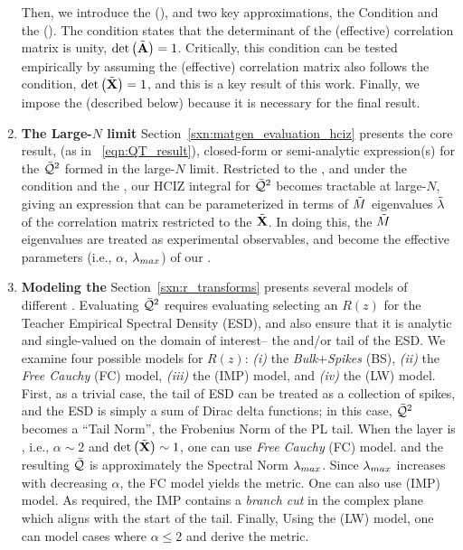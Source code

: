 \begin{enumerate}[label=5.\arabic*]
Then, we introduce the \EffectiveCorrelationSpace (\ECS), and two key approximations,
the \TRACELOG Condition and the \IndependentFluctuationApproximation (\IFA).
The \TRACELOG condition states that the determinant of the (effective) \Student correlation matrix is unity, $\mbox{}{\text{det}}\left(\tilde{\mathbf{A}}\right)=1$.
Critically, this condition can be tested empirically by assuming the (effective) \Teacher correlation matrix
also follows the \TRACELOG condition, $\mbox{}{\text{det}}\left(\tilde{\mathbf{X}}\right)=1$, and this is a key result of this work.
Finally, we impose the \IFA (described below) because it is necessary for the final result.

\item
\textbf{The Large-$N$ limit}
Section~\ref{sxn:matgen_evaluation_hciz} presents the core result,
(as in \EQN~\ref{eqn:QT_result}),
closed-form or semi-analytic expression(s) for the \LayerQualitySquared $\bar{\mathcal{Q}}^{2}$
formed in the large-$N$ limit.
Restricted to the \ECS, and under the \TRACELOG condition and the \IFA, our
HCIZ integral for $\bar{\mathcal{Q}}^{2}$ becomes tractable at large-$N$, giving an expression that can be parameterized
in terms of $\tilde{M}$ eigenvalues $\tilde{\lambda}$ of the \Teacher correlation matrix 
restricted to the \ECS $\tilde{\mathbf{X}}$.
In doing this, the $\tilde{M}$ \Teacher eigenvalues are treated as experimental observables, and 
become the effective \SemiEmpirical parameters (i.e., $\alpha$, $\lambda_{max}$) of our \SETOL.

\item
\textbf{Modeling the \HeavyTailed \RTransform}
Section~\ref{sxn:r_transforms} presents several models of different \RTransforms.
Evaluating $\bar{\mathcal{Q}}^{2}$ requires evaluating selecting an \RTransform $R(z)$ for the Teacher Empirical Spectral Density (ESD),
and also ensure that it is analytic and single-valued on the domain of interest-- the \ECS and/or tail of the ESD.
We examine four possible models for $R(z)$: \emph{(i)} the \emph{Bulk$+$Spikes} (BS),
\emph{(ii)} the \emph{Free Cauchy} (FC) model, 
\emph{(iii)} the \emph{\InverseMP} (IMP) model, 
and \emph{(iv)} the  \LevyWigner (LW) model.
First, as a trivial case, the tail of ESD can be treated as a collection of spikes,
and the ESD is simply a sum of Dirac delta functions; in this case,
$\bar{\mathcal{Q}}^{2}$ becomes a ``Tail Norm'', the Frobenius Norm of the PL tail.
When the layer is \Ideal, i.e., $\alpha\sim 2$ and $\mbox{}{\text{det}}\left(\tilde{\mathbf{X}}\right)\sim 1$,
one can use  \emph{Free Cauchy} (FC) model.  and the resulting \LayerQuality $\bar{\mathcal{Q}}$
is approximately the Spectral Norm $\lambda_{max}$.
Since $\lambda_{max}$ increases with decreasing $\alpha$, the FC model yields the \HTSR \ALPHA metric.
One can also use  \emph{\InverseMP} (IMP) model. 
As required, the IMP \RTransform contains a \emph{branch cut} in the complex plane
which aligns with the start of the \ECS \PowerLaw tail.
Finally, Using the \LevyWigner (LW) model, one can model cases where
$\alpha\le 2$ and derive the \HTSR \ALPHAHAT metric.
\end{enumerate}

